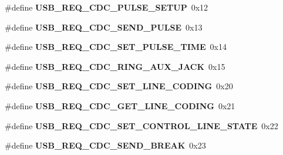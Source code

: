 \begin{DoxyCompactItemize}
\item 
\hypertarget{group__cdc__protocol__group_ga2c303c4a845634355a8f96ac1c965c15}{\#define {\bfseries U\-S\-B\-\_\-\-R\-E\-Q\-\_\-\-C\-D\-C\-\_\-\-P\-U\-L\-S\-E\-\_\-\-S\-E\-T\-U\-P}~0x12}\label{group__cdc__protocol__group_ga2c303c4a845634355a8f96ac1c965c15}

\item 
\hypertarget{group__cdc__protocol__group_gace1ba968487e94d8accfa1817b56899a}{\#define {\bfseries U\-S\-B\-\_\-\-R\-E\-Q\-\_\-\-C\-D\-C\-\_\-\-S\-E\-N\-D\-\_\-\-P\-U\-L\-S\-E}~0x13}\label{group__cdc__protocol__group_gace1ba968487e94d8accfa1817b56899a}

\item 
\hypertarget{group__cdc__protocol__group_gaa95ef54582b5f30d9b343cd1be5b9051}{\#define {\bfseries U\-S\-B\-\_\-\-R\-E\-Q\-\_\-\-C\-D\-C\-\_\-\-S\-E\-T\-\_\-\-P\-U\-L\-S\-E\-\_\-\-T\-I\-M\-E}~0x14}\label{group__cdc__protocol__group_gaa95ef54582b5f30d9b343cd1be5b9051}

\item 
\hypertarget{group__cdc__protocol__group_ga2373fab42c699e4ed789b88a3755255a}{\#define {\bfseries U\-S\-B\-\_\-\-R\-E\-Q\-\_\-\-C\-D\-C\-\_\-\-R\-I\-N\-G\-\_\-\-A\-U\-X\-\_\-\-J\-A\-C\-K}~0x15}\label{group__cdc__protocol__group_ga2373fab42c699e4ed789b88a3755255a}

\item 
\hypertarget{group__cdc__protocol__group_ga4e36b0b1795b8fb8d47f0864fbc50120}{\#define {\bfseries U\-S\-B\-\_\-\-R\-E\-Q\-\_\-\-C\-D\-C\-\_\-\-S\-E\-T\-\_\-\-L\-I\-N\-E\-\_\-\-C\-O\-D\-I\-N\-G}~0x20}\label{group__cdc__protocol__group_ga4e36b0b1795b8fb8d47f0864fbc50120}

\item 
\hypertarget{group__cdc__protocol__group_ga4225199eaffc265eb87f5fd50729428b}{\#define {\bfseries U\-S\-B\-\_\-\-R\-E\-Q\-\_\-\-C\-D\-C\-\_\-\-G\-E\-T\-\_\-\-L\-I\-N\-E\-\_\-\-C\-O\-D\-I\-N\-G}~0x21}\label{group__cdc__protocol__group_ga4225199eaffc265eb87f5fd50729428b}

\item 
\hypertarget{group__cdc__protocol__group_ga5095b668106c8843dda529f539e0eed1}{\#define {\bfseries U\-S\-B\-\_\-\-R\-E\-Q\-\_\-\-C\-D\-C\-\_\-\-S\-E\-T\-\_\-\-C\-O\-N\-T\-R\-O\-L\-\_\-\-L\-I\-N\-E\-\_\-\-S\-T\-A\-T\-E}~0x22}\label{group__cdc__protocol__group_ga5095b668106c8843dda529f539e0eed1}

\item 
\hypertarget{group__cdc__protocol__group_ga7cba4467d40cd6532019864a7d068c8d}{\#define {\bfseries U\-S\-B\-\_\-\-R\-E\-Q\-\_\-\-C\-D\-C\-\_\-\-S\-E\-N\-D\-\_\-\-B\-R\-E\-A\-K}~0x23}\label{group__cdc__protocol__group_ga7cba4467d40cd6532019864a7d068c8d}


\end{DoxyCompactItemize}
